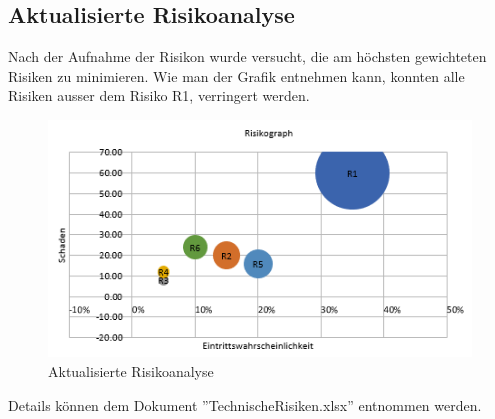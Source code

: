 \subsection{Aktualisierte Risikoanalyse}
Nach der Aufnahme der Risikon wurde versucht, die am höchsten gewichteten Risiken zu minimieren. Wie man der Grafik entnehmen kann, konnten alle Risiken ausser dem Risiko R1, verringert werden.
\begin{figure}[H]
	\includegraphics[width=\textwidth,height=\textheight,keepaspectratio]{images/risikoanalyse_nachher.png}
	\caption{Aktualisierte Risikoanalyse}
\end{figure}

Details können dem Dokument ''TechnischeRisiken.xlsx'' entnommen werden.
\newpage